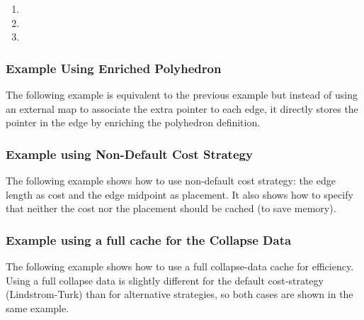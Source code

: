 \begin{enumerate}
\item {}
\item {}
\item {}
\end{enumerate}


\subsubsection{Example Using Enriched Polyhedron}

The following example is equivalent to the previous example but instead of using an external map to associate the extra pointer to each edge, it directly stores the pointer in the edge by enriching the polyhedron definition.


\subsubsection{Example using Non-Default Cost Strategy}

The following example shows how to use non-default cost strategy: the edge length as cost and the edge
midpoint as placement. It also shows how to specify that neither the cost nor the placement should be cached (to save memory).


\subsubsection{Example using a full cache for the Collapse Data}

The following example shows how to use a full collapse-data cache for efficiency. Using a full collapse data is slightly different for the default cost-strategy (Lindstrom-Turk) than for alternative strategies, so both cases are shown in the same example.


